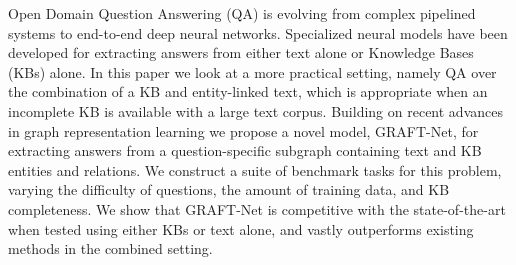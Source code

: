 Open Domain Question Answering (QA) is evolving from complex pipelined systems to end-to-end deep neural networks. Specialized neural models have been developed for extracting answers from either text alone or Knowledge Bases (KBs) alone. In this paper we look at a more practical setting, namely QA over the combination of a KB and entity-linked text, which is appropriate when an incomplete KB is available with a large text corpus. Building on recent advances in graph representation learning we propose a novel model, GRAFT-Net, for extracting answers from a question-specific subgraph containing text and KB entities and relations. We construct a suite of benchmark tasks for this problem, varying the difficulty of questions, the amount of training data, and KB completeness. We show that GRAFT-Net is competitive with the state-of-the-art when tested using either KBs or text alone, and vastly outperforms existing methods in the combined setting.
